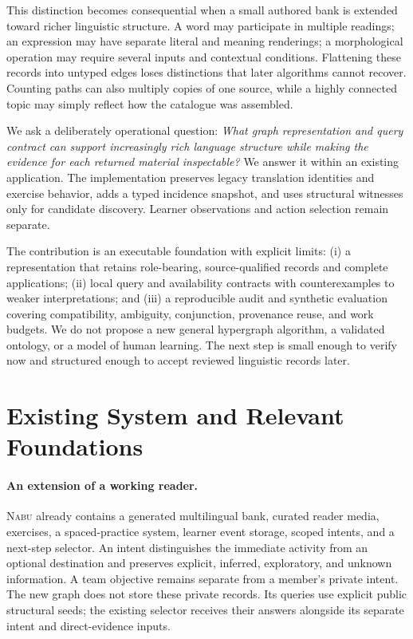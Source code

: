 \documentclass{article}
\newcommand{\Nabu}{\textsc{Nabu}}
\begin{document}
This distinction becomes consequential when a small authored bank is extended toward richer linguistic structure. A word may participate in multiple readings; an expression may have separate literal and meaning renderings; a morphological operation may require several inputs and contextual conditions. Flattening these records into untyped edges loses distinctions that later algorithms cannot recover. Counting paths can also multiply copies of one source, while a highly connected topic may simply reflect how the catalogue was assembled.

We ask a deliberately operational question: \emph{What graph representation and query contract can support increasingly rich language structure while making the evidence for each returned material inspectable?} We answer it within an existing application. The implementation preserves legacy translation identities and exercise behavior, adds a typed incidence snapshot, and uses structural witnesses only for candidate discovery. Learner observations and action selection remain separate.

The contribution is an executable foundation with explicit limits: (i) a representation that retains role-bearing, source-qualified records and complete applications; (ii) local query and availability contracts with counterexamples to weaker interpretations; and (iii) a reproducible audit and synthetic evaluation covering compatibility, ambiguity, conjunction, provenance reuse, and work budgets. We do not propose a new general hypergraph algorithm, a validated ontology, or a model of human learning. The next step is small enough to verify now and structured enough to accept reviewed linguistic records later.

\section{Existing System and Relevant Foundations}
\label{sec:setting}

\paragraph{An extension of a working reader.}
\Nabu{} already contains a generated multilingual bank, curated reader media, exercises, a spaced-practice system, learner event storage, scoped intents, and a next-step selector. An intent distinguishes the immediate activity from an optional destination and preserves explicit, inferred, exploratory, and unknown information. A team objective remains separate from a member's private intent. The new graph does not store these private records. Its queries use explicit public structural seeds; the existing selector receives their answers alongside its separate intent and direct-evidence inputs.
\end{document}
